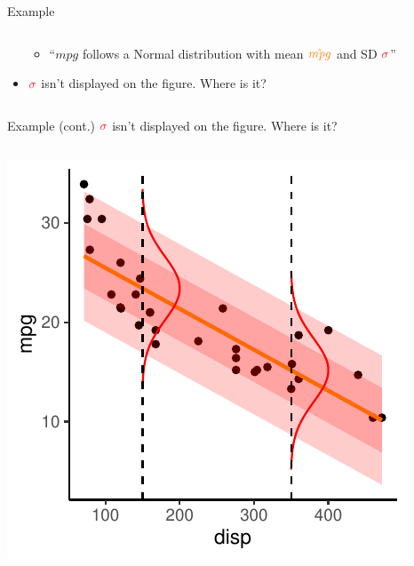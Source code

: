 \documentclass[
  ignorenonframetext,
  aspectratio=169]{beamer}
\providecommand{\tightlist}{%
  \setlength{\itemsep}{0pt}\setlength{\parskip}{0pt}}
\begin{document}
\begin{frame}{Example}
\begin{columns}[T]
\begin{column}{0.48\textwidth}
\begin{itemize}[<+->]
  \begin{itemize}[<+->]
  \tightlist
  \item
    ``\(mpg\) follows a Normal distribution with mean
    \(\textcolor{orange}{\hat{mpg}}\) and SD
    \(\textcolor{red}{\sigma}\)''
  \end{itemize}
\item
  \(\textcolor{red}{\sigma}\) isn't displayed on the figure. Where is
  it?
\end{itemize}
\end{column}
\end{columns}
\end{frame}

\begin{frame}{Example (cont.)}
\protect\hypertarget{example-cont.}{}
\(\textcolor{red}{\sigma}\) isn't displayed on the figure. Where is it?

\begin{columns}[T]
\begin{column}{0.48\textwidth}
\includegraphics{03-Lecture_files/figure-beamer/unnamed-chunk-2-1.pdf}
\end{column}


\end{columns}
\end{frame}
\end{document}
